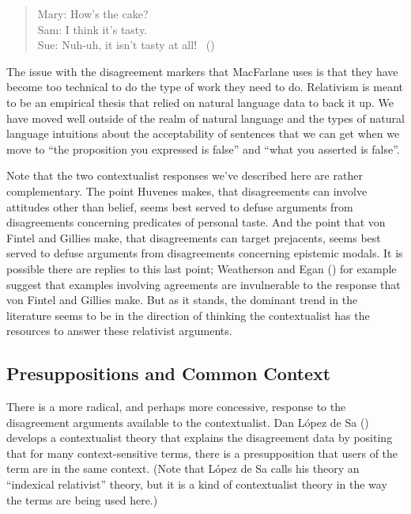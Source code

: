 \documentclass[
  11pt,
  letterpaper,
  DIV=11,
  numbers=noendperiod,
  twoside]{scrartcl}
\begin{document}
\begin{quote}
Mary: How's the cake?\\
Sam: I think it's tasty.\\
Sue: Nuh-uh, it isn't tasty at all!
~()
\end{quote}

The issue with the disagreement markers that MacFarlane uses is that
they have become too technical to do the type of work they need to do.
Relativism is meant to be an empirical thesis that relied on natural
language data to back it up. We have moved well outside of the realm of
natural language and the types of natural language intuitions about the
acceptability of sentences that we can get when we move to ``the
proposition you expressed is false'' and ``what you asserted is false''.

Note that the two contextualist responses we've described here are
rather complementary. The point Huvenes makes, that disagreements can
involve attitudes other than belief, seems best served to defuse
arguments from disagreements concerning predicates of personal taste.
And the point that von Fintel and Gillies make, that disagreements can
target prejacents, seems best served to defuse arguments from
disagreements concerning epistemic modals. It is possible there are
replies to this last point; Weatherson and Egan
() for example suggest that
examples involving agreements are invulnerable to the response that von
Fintel and Gillies make. But as it stands, the dominant trend in the
literature seems to be in the direction of thinking the contextualist
has the resources to answer these relativist arguments.

\subsection{Presuppositions and Common
Context}\label{presuppositionsandcommoncontext}

There is a more radical, and perhaps more concessive, response to the
disagreement arguments available to the contextualist. Dan López de Sa
() develops a contextualist theory
that explains the disagreement data by positing that for many
context-sensitive terms, there is a presupposition that users of the
term are in the same context. (Note that López de Sa calls his theory an
``indexical relativist'' theory, but it is a kind of contextualist
theory in the way the terms are being used here.)
\end{document}
